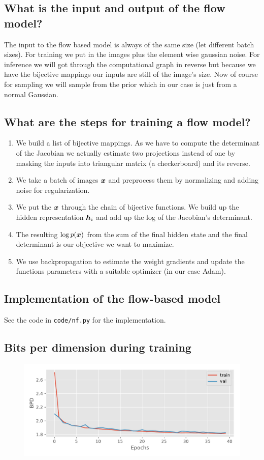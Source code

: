\documentclass{article}
\begin{document}
\subsection{What is the input and output of the flow model?}
The input to the flow based model is always of the same size (let different batch sizes).
For training we put in the images plus the element wise gaussian noise.
For inference we will got through the computational graph in reverse but because we have the bijective mappings our inputs are still of the image's size.
Now of course for sampling we will sample from the prior which in our case is just from a normal Gaussian.

\subsection{What are the steps for training a flow model?}
\begin{enumerate}
  \item We build a list of bijective mappings. As we have to compute the determinant of the Jacobian we actually estimate two projections instead of one by masking the inputs into triangular matrix (a checkerboard) and its reverse.
  \item We take a batch of images \(\B{x}\) and preprocess them by normalizing and adding noise for regularization.
  \item We put the \(\B{x}\) through the chain of bijective functions. We build up the hidden representation \(\B{h}_i\) and add up the log of the Jacobian's determinant.
  \item The resulting \(\log p(\B{x})\) from the sum of the final hidden state and the final determinant is our objective we want to maximize.
  \item We use backpropagation to estimate the weight gradients and update the functions parameters with a suitable optimizer (in our case Adam).
\end{enumerate}

\subsection{Implementation of the flow-based model}
See the code in \texttt{code/nf.py} for the implementation.

\subsection{Bits per dimension during training}
\begin{figure}
  \centering
  \includegraphics[width=0.7\linewidth]{assignment_3/code/figures/nf.pdf}
  \caption{}
  \label{fig:nf}
\end{figure}



\end{document}
